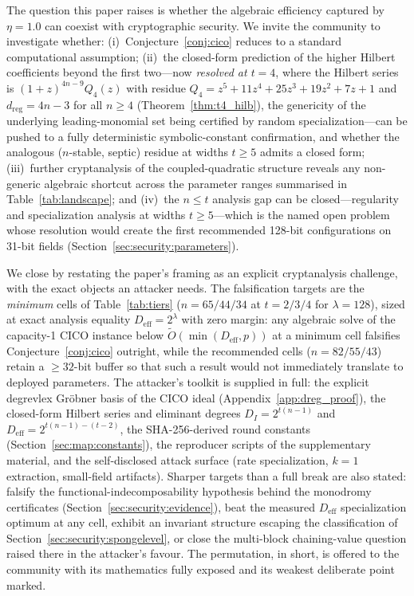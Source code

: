 \documentclass[11pt,a4paper]{article}
\theoremstyle{definition}
\begin{document}
The question this paper raises is whether the algebraic efficiency
captured by $\eta = 1.0$ can coexist with cryptographic security. We
invite the community to investigate whether: (i)~Conjecture~\ref{conj:cico}
reduces to a standard computational assumption;
(ii)~the closed-form prediction of the higher Hilbert coefficients
beyond the first two---now \emph{resolved at $t = 4$}, where the
Hilbert series is $(1+z)^{4n-9} Q_4(z)$ with residue $Q_4 =
z^5 + 11 z^4 + 25 z^3 + 19 z^2 + 7 z + 1$ and $d_{\mathrm{reg}} = 4n-3$
for all $n \ge 4$ (Theorem~\ref{thm:t4_hilb}), the genericity of the
underlying leading-monomial set being certified by random
specialization---can be pushed to a fully deterministic
symbolic-constant confirmation, and whether the analogous
($n$-stable, septic) residue at widths $t \ge 5$ admits a closed form;
(iii)~further cryptanalysis of the coupled-quadratic structure reveals
any non-generic algebraic shortcut across the parameter ranges summarised
in Table~\ref{tab:landscape}; and (iv)~the $n \le t$ analysis gap can
be closed---regularity and specialization analysis at widths
$t \ge 5$---which is the named open problem whose resolution would
create the first recommended 128-bit configurations on 31-bit fields
(Section~\ref{sec:security:parameters}).

We close by restating the paper's framing as an explicit
cryptanalysis challenge, with the exact objects an attacker needs.
The falsification targets are the \emph{minimum} cells of
Table~\ref{tab:tiers} ($n = 65/44/34$ at $t = 2/3/4$ for
$\lambda = 128$), sized at exact analysis equality
$D_{\mathrm{eff}} = 2^{\lambda}$ with zero margin: any algebraic
solve of the capacity-1 CICO instance below
$\widetilde{O}(\min(D_{\mathrm{eff}}, p))$ at a minimum cell
falsifies Conjecture~\ref{conj:cico} outright, while the recommended
cells ($n = 82/55/43$) retain a $\ge 32$-bit buffer so that such a
result would not immediately translate to deployed parameters. The
attacker's toolkit is supplied in full: the explicit degrevlex
Gr\"obner basis of the CICO ideal (Appendix~\ref{app:dreg_proof}),
the closed-form Hilbert series and eliminant degrees
$D_I = 2^{t(n-1)}$ and $D_{\mathrm{eff}} = 2^{t(n-1)-(t-2)}$, the
SHA-256-derived round constants (Section~\ref{sec:map:constants}),
the reproducer scripts of the supplementary material, and the
self-disclosed attack surface (rate specialization, $k=1$
extraction, small-field artifacts). Sharper targets than a full
break are also stated: falsify the functional-indecomposability
hypothesis behind the monodromy certificates
(Section~\ref{sec:security:evidence}), beat the measured
$D_{\mathrm{eff}}$ specialization optimum at any cell, exhibit an
invariant structure escaping the classification of
Section~\ref{sec:security:spongelevel}, or close the multi-block
chaining-value question raised there in the attacker's favour. The
permutation, in short, is offered to the community with its
mathematics fully exposed and its weakest deliberate point marked.
\end{document}
